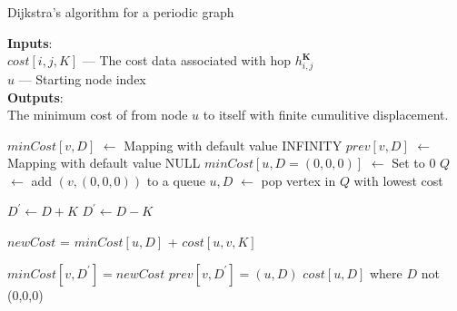 \documentclass[reprint,preprintnumbers,amsmath,amssymb,aps,prl]{revtex4-1}
\begin{document}
\begin{algorithm}[H]
    \caption{Dijkstra's algorithm for a periodic graph}
    \label{algo:periodic}
     \textbf{Inputs}: \\
     \hspace*{\algorithmicindent} $cost[i,j,K]$ --- The cost data associated with hop $h_{i,j}^{\bm{K}}$ \\
     \hspace*{\algorithmicindent} $u$ ---  Starting node index \\  
    \textbf{Outputs}: \\ 
    \hspace*{\algorithmicindent} The minimum cost of from node $u$ to itself with finite cumulitive displacement.
    \begin{algorithmic}[1]
        \State $minCost[v, D]$ $\leftarrow$ Mapping with default value INFINITY
        \State $prev[v, D]$ $\leftarrow$ Mapping with default value NULL
        \State $minCost[u, D=(0,0,0)]$ $\leftarrow$ Set to 0
        \State $Q$ $\leftarrow$ add $(v, (0,0,0))$ to a queue
        \State $u, D$ $\leftarrow$ pop vertex in $Q$ with lowest cost

        \State $D^\prime \leftarrow D + K$
        \Else{}
        \State $D^\prime \leftarrow D - K$
        \EndIf

        \State $newCost$ = $minCost[u,D]$ + $cost[u,v,K]$
        
            \State $minCost[v, D^\prime] = newCost$ 
            \State $prev[v, D^\prime] = (u, D)$ 
        \EndIf
        \EndFor
        \EndWhile
        \State \Return $cost[u, D]$ where $D$ not (0,0,0)

    \end{algorithmic}
\end{algorithm}
\end{document}
